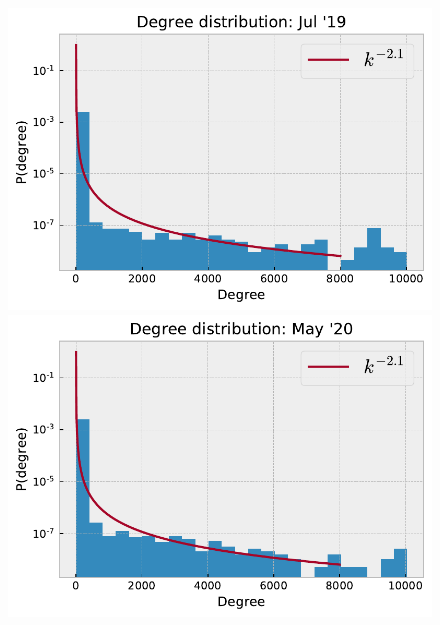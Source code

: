 \documentclass[10pt,a4paper]{article}
\begin{document}
\begin{multicols}{2}
\begin{figure}[!ht]
\begin{minipage}[t]{.33\textwidth}
\end{minipage}\\
\begin{minipage}[t]{.33\textwidth}
\includegraphics[scale=0.4]{figures/degree_dist_jul_19.pdf}
\end{minipage}%
\begin{minipage}[t]{.33\textwidth}
\includegraphics[scale=0.4]{figures/degree_dist_may_20.pdf}
\end{minipage}
\begin{minipage}[t]{.33\textwidth}

\end{minipage}
\end{figure}
\end{multicols}
\end{document}
